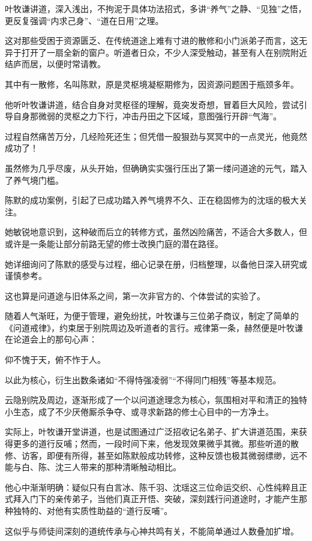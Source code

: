 叶牧谦讲道，深入浅出，不拘泥于具体功法招式，多讲“养气”之静、“见独”之悟，更反复强调“内求己身”、“道在日用”之理。

这对那些受困于资源匮乏、在传统道途上难有寸进的散修和小门派弟子而言，这无异于打开了一扇全新的窗户。听道者日众，不少人深受触动，甚至有人在别院附近结庐而居，以便时常请教。

其中有一散修，名叫陈默，原是灵枢境凝枢期修为，因资源问题困于瓶颈多年。

他听叶牧谦讲道，结合自身对灵枢径的理解，竟突发奇想，冒着巨大风险，尝试引导自身那微弱的灵枢之力下行，冲击丹田之下区域，意图强行开辟“气海”。

过程自然痛苦万分，几经险死还生；但凭借一股狠劲与冥冥中的一点灵光，他竟然成功了！

虽然修为几乎尽废，从头开始，但确确实实强行压出了第一缕问道途的元气，踏入了养气境门槛。

陈默的成功案例，引起了已成功踏入养气境界不久、正在稳固修为的沈瑶的极大关注。

她敏锐地意识到，这种破而后立的转修方式，虽然凶险痛苦，不适合大多数人，但或许是一条能让部分前路无望的修士改换门庭的潜在路径。

她详细询问了陈默的感受与过程，细心记录在册，归档整理，以备他日深入研究或谨慎参考。

这也算是问道途与旧体系之间，第一次非官方的、个体尝试的实验了。

\vspace{2em}

随着人气渐旺，为便于管理，避免纷扰，叶牧谦与三位弟子商议，制定了简单的《问道戒律》，约束居于别院周边及听道者的言行。戒律第一条，赫然便是叶牧谦在论道会上的那句心声：

仰不愧于天，俯不怍于人。

以此为核心，衍生出数条诸如“不得恃强凌弱”“不得同门相残”等基本规范。

云隐别院及周边，逐渐形成了一个以问道途理念为核心，氛围相对平和清正的独特小生态，成了不少厌倦厮杀争夺、或寻求新路的修士心目中的一方净土。

实际上，叶牧谦开堂讲道，也是试图通过广泛招收记名弟子、扩大讲道范围，来获得更多的道行反哺；然而，一段时间下来，他发现效果微乎其微。那些听道的散修、访客，即便有所得，甚至如陈默般成功转修，这种反馈也极其微弱缥缈，远不能与白、陈、沈三人带来的那种清晰触动相比。

他心中渐渐明确：疑似只有白言冰、陈千羽、沈瑶这三位命运交织、心性纯粹且正式拜入门下的亲传弟子，当他们真正开悟、突破，深刻践行问道途时，才能产生那种独特的、对他有实质性助益的“道行反哺”。

这似乎与师徒间深刻的道统传承与心神共鸣有关，不能简单通过人数叠加扩增。

